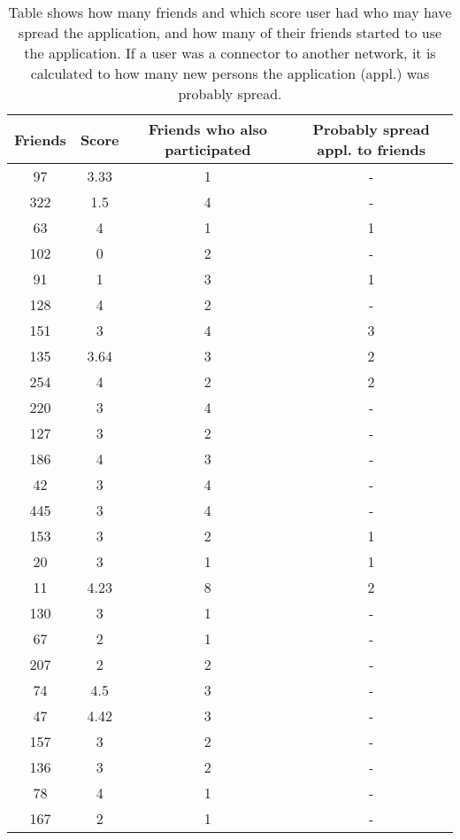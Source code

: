 \documentclass[preprint,12pt]{elsarticle}
\begin{document}
 \begin{table}
 \label{tab:spread}
 \begin{tabular}{ c c c c}
Friends & Score & Friends who also participated & Probably spread appl. to friends\\
\hline
97 & 3.33 & 1 &-\\
322 & 1.5 & 4 & -\\
63 & 4 & 1 & 1\\
102 & 0 & 2 & -\\
91 & 1 & 3 &1\\
128 & 4 & 2 & -\\
151 & 3 & 4 &3\\
135 & 3.64 & 3 &2\\
254 & 4 & 2 & 2\\
220 & 3 & 4 & -\\
127 & 3 & 2 & -\\
186 & 4 & 3 & -\\
42 & 3 & 4 & - \\
445 & 3 & 4 & - \\
153 & 3 & 2 &1\\
20 & 3 & 1 &1\\
11 & 4.23 & 8 &2\\
130 & 3 & 1 & -\\
67 & 2 & 1 & - \\
207 & 2 & 2 & -\\
74 & 4.5 & 3 & -\\
47 & 4.42 & 3& -\\
157 & 3 & 2 & -\\
136 & 3 & 2 & -\\
78 & 4 & 1 & -\\
167 & 2 &1 & -
\end{tabular}
\caption{Table shows how many friends and which score user had who may have spread the
  application, and how many of their friends started to use the
  application. If a user was a connector to another network, it is
  calculated to how many new persons the application (appl.) was
  probably spread.}
\end{table}
\end{document}
